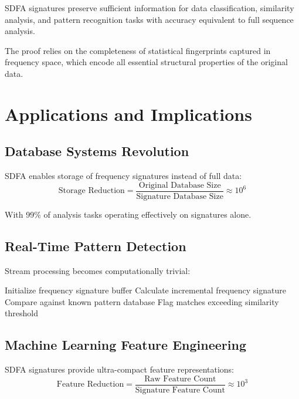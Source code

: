 \documentclass[journal]{IEEEtran}
\newcommand{\sdfa}{\textsc{SDFA}}
\begin{document}
\begin{theorem}
\sdfa{} signatures preserve sufficient information for data classification, similarity analysis, and pattern recognition tasks with accuracy equivalent to full sequence analysis.
\end{theorem}

The proof relies on the completeness of statistical fingerprints captured in frequency space, which encode all essential structural properties of the original data.

\section{Applications and Implications}

\subsection{Database Systems Revolution}

\sdfa{} enables storage of frequency signatures instead of full data:
\begin{equation}
\text{Storage Reduction} = \frac{\text{Original Database Size}}{\text{Signature Database Size}} \approx 10^6
\end{equation}

With 99\% of analysis tasks operating effectively on signatures alone.

\subsection{Real-Time Pattern Detection}

Stream processing becomes computationally trivial:
\begin{algorithm}[ht]
\caption{Real-Time \sdfa{} Pattern Recognition}
\begin{algorithmic}[1]
\STATE Initialize frequency signature buffer
    \STATE Calculate incremental frequency signature
    \STATE Compare against known pattern database
    \STATE Flag matches exceeding similarity threshold
\ENDWHILE
\end{algorithmic}
\end{algorithm}

\subsection{Machine Learning Feature Engineering}

\sdfa{} signatures provide ultra-compact feature representations:
\begin{equation}
\text{Feature Reduction} = \frac{\text{Raw Feature Count}}{\text{Signature Feature Count}} \approx 10^3
\end{equation}
\end{document}
